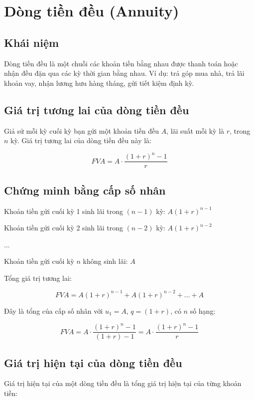 \documentclass[12pt,a4paper]{report}
\begin{document}
\section{Dòng tiền đều (Annuity)}

\subsection{Khái niệm}

Dòng tiền đều là một chuỗi các khoản tiền bằng nhau được thanh toán hoặc nhận đều đặn qua các kỳ thời gian bằng nhau. Ví dụ: trả góp mua nhà, trả lãi khoản vay, nhận lương hưu hàng tháng, gửi tiết kiệm định kỳ.

\subsection{Giá trị tương lai của dòng tiền đều}

Giả sử mỗi kỳ cuối kỳ bạn gửi một khoản tiền đều $A$, lãi suất mỗi kỳ là $r$, trong $n$ kỳ. Giá trị tương lai của dòng tiền đều này là:

\[
    FVA = A \cdot \frac{(1 + r)^n - 1}{r}
\]

\subsection{Chứng minh bằng cấp số nhân}

Khoản tiền gửi cuối kỳ 1 sinh lãi trong $(n-1)$ kỳ:
$A(1 + r)^{n-1}$

Khoản tiền gửi cuối kỳ 2 sinh lãi trong $(n-2)$ kỳ:
$A(1 + r)^{n-2}$

$\dots$

Khoản tiền gửi cuối kỳ $n$ không sinh lãi:
$A$

Tổng giá trị tương lai:

\[
    FVA = A(1 + r)^{n-1}
    + A(1 + r)^{n-2}
    + \dots + A
\]

Đây là tổng của cấp số nhân với $u_1 = A$, $q = (1 + r)$, có $n$ số hạng:

\[
    FVA
    = A \cdot
    \frac{(1 + r)^n - 1}{(1 + r) - 1}
    = A \cdot \frac{(1 + r)^n - 1}{r}
\]

\subsection{Giá trị hiện tại của dòng tiền đều}

Giá trị hiện tại của một dòng tiền đều là tổng giá trị hiện tại của từng khoản tiền:
\end{document}
